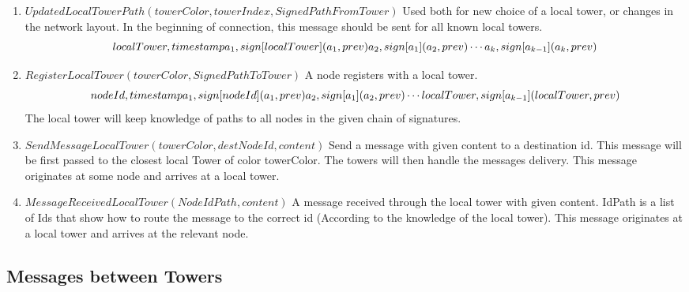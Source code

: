 \documentclass{amsart}
\theoremstyle{definition}
\theoremstyle{remark}
\numberwithin{equation}{section}
\begin{document}
\begin{enumerate}
  \item $UpdatedLocalTowerPath(towerColor, towerIndex, SignedPathFromTower)$
      Used both for new choice of a local tower, or changes in the network
      layout. In the beginning of connection, this message should be sent for
      all known local towers. 
      \[
        localTower,   timestamp                     \\
        a_1,          sign[localTower](a_1, prev)   \\
        a_2,          sign[a_1](a_2, prev)          \\
        \cdots                                      \\
        a_k,          sign[a_{k-1}](a_k, prev)
      \]

  \item $RegisterLocalTower(towerColor, SignedPathToTower)$
      A node registers with a local tower.
      \[
        nodeId,       timestamp                   \\
        a_1,          sign[nodeId](a_1, prev)     \\
        a_2,          sign[a_1](a_2, prev)        \\
        \cdots                                    \\
        localTower,   sign[a_{k-1}](localTower, prev)
      \]
      The local tower will keep knowledge of paths to all nodes in the given
      chain of signatures.

  \item $SendMessageLocalTower(towerColor, destNodeId, content)$
    Send a message with given content to a destination id.
    This message will be first passed to the closest local Tower of color
    towerColor. The towers will then handle the messages delivery. This message
    originates at some node and arrives at a local tower.

  \item $MessageReceivedLocalTower(NodeIdPath, content)$
    A message received through the local tower with given content.
    IdPath is a list of Ids that show how to route the message to the correct
    id (According to the knowledge of the local tower).
    This message originates at a local tower and arrives at the relevant node.

\end{enumerate}


\subsection{Messages between Towers}
\end{document}

